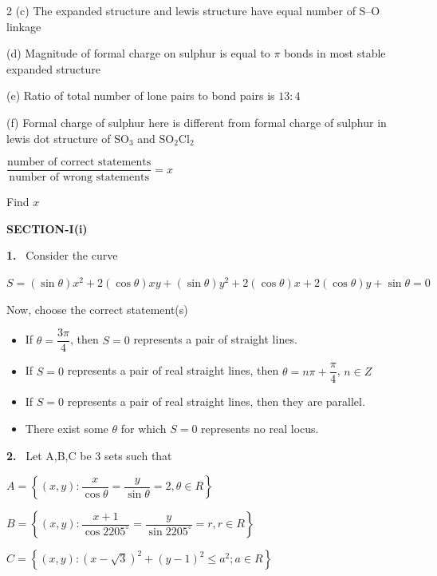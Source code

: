\documentclass[10pt]{extarticle}
\newcommand{\partsec}[2]{\par\medskip\noindent{\large\bfseries PART-#1: #2}\par\smallskip}
\newcommand{\sect}[1]{\par\smallskip\noindent\textbf{#1}\par}
\newcommand{\qn}[1]{\par\smallskip\noindent\textbf{#1.}~}
\newenvironment{qoptions}{\begin{itemize}[leftmargin=1.8em,itemsep=1pt,topsep=2pt,label={}]}{\end{itemize}}
\newcommand{\opt}[2]{\item[(#1)] #2}
\begin{document}
\begin{multicols}{2}
(c) The expanded structure and lewis structure have equal number of S--O linkage

(d) Magnitude of formal charge on sulphur is equal to $\pi$ bonds in most stable expanded structure

(e) Ratio of total number of lone pairs to bond pairs is $13:4$

(f) Formal charge of sulphur here is different from formal charge of sulphur in lewis dot structure of $\mathrm{SO_3}$ and $\mathrm{SO_2Cl_2}$

$\dfrac{\text{number of correct statements}}{\text{number of wrong statements}}=x$

Find $x$
\partsec{3}{MATHEMATICS}
\sect{SECTION-I(i)}
\qn{1} Consider the curve

$S=(\sin\theta)x^2+2(\cos\theta)xy+(\sin\theta)y^2+2(\cos\theta)x+2(\cos\theta)y+\sin\theta=0$

Now, choose the correct statement(s)
\begin{qoptions}
\opt{A}{If $\theta=\dfrac{3\pi}{4}$, then $S=0$ represents a pair of straight lines.}
\opt{B}{If $S=0$ represents a pair of real straight lines, then $\theta=n\pi+\dfrac\pi4$, $n\in Z$}
\opt{C}{If $S=0$ represents a pair of real straight lines, then they are parallel.}
\opt{D}{There exist some $\theta$ for which $S=0$ represents no real locus.}
\end{qoptions}
\qn{2} Let A,B,C be $3$ sets such that

$A=\left\{(x,y):\dfrac{x}{\cos\theta}=\dfrac{y}{\sin\theta}=2,\theta\in R\right\}$

$B=\left\{(x,y):\dfrac{x+1}{\cos2205^\circ}=\dfrac{y}{\sin2205^\circ}=r,r\in R\right\}$

$C=\left\{(x,y):(x-\sqrt3)^2+(y-1)^2\leqslant a^2;a\in R\right\}$


\end{multicols}
\end{document}
